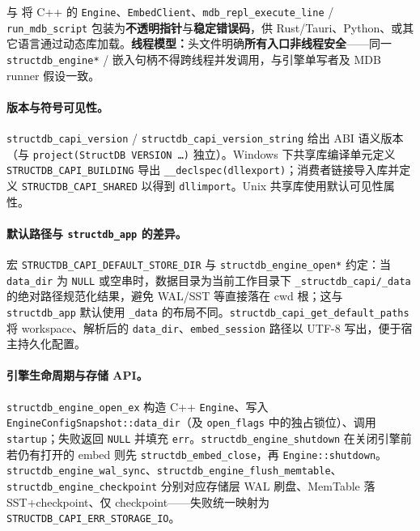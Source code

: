  与  将 C++ 的 \texttt{Engine}、\texttt{EmbedClient}、\texttt{mdb\_repl\_execute\_line} / \texttt{run\_mdb\_script} 包装为\textbf{不透明指针}与\textbf{稳定错误码}，供 Rust/Tauri、Python、或其它语言通过动态库加载。\textbf{线程模型：}头文件明确\textbf{所有入口非线程安全}——同一 \texttt{structdb\_engine*} / 嵌入句柄不得跨线程并发调用，与引擎单写者及 MDB runner 假设一致。

\paragraph{版本与符号可见性。}\texttt{structdb\_capi\_version} / \texttt{structdb\_capi\_version\_string} 给出 ABI 语义版本（与 \texttt{project(StructDB VERSION \ldots)} 独立）。Windows 下共享库编译单元定义 \texttt{STRUCTDB\_CAPI\_BUILDING} 导出 \texttt{\_\_declspec(dllexport)}；消费者链接导入库并定义 \texttt{STRUCTDB\_CAPI\_SHARED} 以得到 \texttt{dllimport}。Unix 共享库使用默认可见性属性。

\paragraph{默认路径与 \texttt{structdb\_app} 的差异。}宏 \texttt{STRUCTDB\_CAPI\_DEFAULT\_STORE\_DIR} 与 \texttt{structdb\_engine\_open*} 约定：当 \texttt{data\_dir} 为 \texttt{NULL} 或空串时，数据目录为当前工作目录下 \texttt{\_structdb\_capi/\_data} 的绝对路径规范化结果，避免 WAL/SST 等直接落在 cwd 根；这与 \texttt{structdb\_app} 默认使用 \texttt{\_data} 的布局不同。\texttt{structdb\_capi\_get\_default\_paths} 将 workspace、解析后的 \texttt{data\_dir}、\texttt{embed\_session} 路径以 UTF-8 写出，便于宿主持久化配置。

\paragraph{引擎生命周期与存储 API。}\texttt{structdb\_engine\_open\_ex} 构造 C++ \texttt{Engine}、写入 \texttt{EngineConfigSnapshot::data\_dir}（及 \texttt{open\_flags} 中的独占锁位）、调用 \texttt{startup}；失败返回 \texttt{NULL} 并填充 \texttt{err}。\texttt{structdb\_engine\_shutdown} 在关闭引擎前若仍有打开的 embed 则先 \texttt{structdb\_embed\_close}，再 \texttt{Engine::shutdown}。\texttt{structdb\_engine\_wal\_sync}、\texttt{structdb\_engine\_flush\_memtable}、\texttt{structdb\_engine\_checkpoint} 分别对应存储层 WAL 刷盘、MemTable 落 SST+checkpoint、仅 checkpoint——失败统一映射为 \texttt{STRUCTDB\_CAPI\_ERR\_STORAGE\_IO}。

